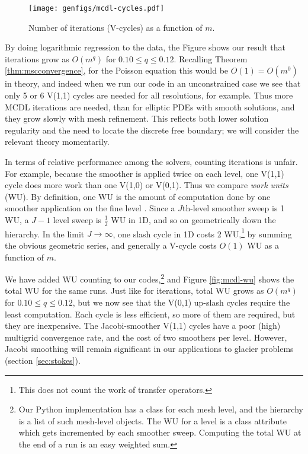 \documentclass[letterpaper,final,12pt,reqno]{amsart}
\theoremstyle{claim}
\numberwithin{equation}{section}
\numberwithin{figure}{section}
\numberwithin{table}{section}
\numberwithin{theorem}{section}
\begin{document}
\begin{figure}
\texttt{[image: genfigs/mcdl-cycles.pdf]}
\caption{Number of iterations (V-cycles) as a function of $m$.}
\label{fig:mcdl-cycles}
\end{figure}

By doing logarithmic regression to the data, the Figure shows our result that iterations grow as $O(m^q)$ for $0.10 \le q \le 0.12$.  Recalling Theorem \ref{thm:mscconvergence}, for the Poisson equation this would be $O(1) = O(m^0)$ in theory, and indeed when we run our code in an unconstrained case we see that only 5 or 6 V(1,1) cycles are needed for all resolutions, for example.  Thus more MCDL iterations are needed, than for elliptic PDEs with smooth solutions, and they grow slowly with mesh refinement.  This reflects both lower solution regularity and the need to locate the discrete free boundary; we will consider the relevant theory momentarily.

In terms of relative performance among the solvers, counting iterations is unfair.  For example, because the smoother is applied twice on each level, one V(1,1) cycle does more work than one V(1,0) or V(0,1).  Thus we compare \emph{work units} (WU).  By definition, one WU is the amount of computation done by one smoother application on the fine level \cite{Briggsetal2000}.  Since a $J$th-level smoother sweep is 1 WU, a $J-1$ level sweep is $\frac{1}{2}$ WU in 1D, and so on geometrically down the hierarchy.  In the limit $J\to\infty$, one slash cycle in 1D costs 2 WU,\footnote{This does not count the work of transfer operators.} by summing the obvious geometric series, and generally a V-cycle costs $O(1)$ WU as a function of $m$.

We have added WU counting to our codes,\footnote{Our Python implementation has a class for each mesh level, and the hierarchy is a list of such mesh-level objects.  The WU for a level is a class attribute which gets incremented by each smoother sweep.  Computing the total WU at the end of a run is an easy weighted sum.} and Figure \ref{fig:mcdl-wu} shows the total WU for the same runs.  Just like for iterations, total WU grows as $O(m^q)$ for $0.10 \le q \le 0.12$, but we now see that the V(0,1) up-slash cycles require the least computation.  Each cycle is less efficient, so more of them are required, but they are inexpensive.  The Jacobi-smoother V(1,1) cycles have a poor (high) multigrid convergence rate, and the cost of two smoothers per level.  However, Jacobi smoothing will remain significant in our applications to glacier problems (section \ref{sec:stokes}).
\end{document}
